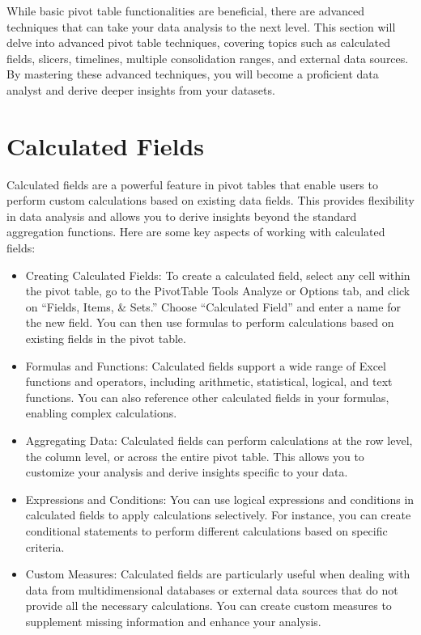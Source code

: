 \documentclass[
]{book}
\begin{document}
While basic pivot table functionalities are beneficial, there are advanced techniques that can take your data analysis to the next level. This section will delve into advanced pivot table techniques, covering topics such as calculated fields, slicers, timelines, multiple consolidation ranges, and external data sources. By mastering these advanced techniques, you will become a proficient data analyst and derive deeper insights from your datasets.

\hypertarget{calculated-fields}{%
\section{Calculated Fields}\label{calculated-fields}}

Calculated fields are a powerful feature in pivot tables that enable users to perform custom calculations based on existing data fields. This provides flexibility in data analysis and allows you to derive insights beyond the standard aggregation functions. Here are some key aspects of working with calculated fields:

\begin{itemize}
\item
  Creating Calculated Fields: To create a calculated field, select any cell within the pivot table, go to the PivotTable Tools Analyze or Options tab, and click on ``Fields, Items, \& Sets.'' Choose ``Calculated Field'' and enter a name for the new field. You can then use formulas to perform calculations based on existing fields in the pivot table.
\item
  Formulas and Functions: Calculated fields support a wide range of Excel functions and operators, including arithmetic, statistical, logical, and text functions. You can also reference other calculated fields in your formulas, enabling complex calculations.
\item
  Aggregating Data: Calculated fields can perform calculations at the row level, the column level, or across the entire pivot table. This allows you to customize your analysis and derive insights specific to your data.
\item
  Expressions and Conditions: You can use logical expressions and conditions in calculated fields to apply calculations selectively. For instance, you can create conditional statements to perform different calculations based on specific criteria.
\item
  Custom Measures: Calculated fields are particularly useful when dealing with data from multidimensional databases or external data sources that do not provide all the necessary calculations. You can create custom measures to supplement missing information and enhance your analysis.
\end{itemize}
\end{document}
